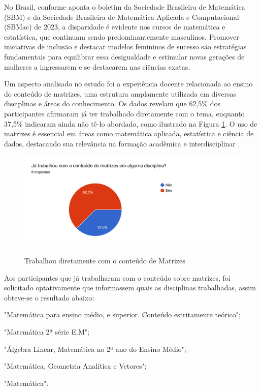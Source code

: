 No Brasil, conforme aponta o boletim da Sociedade Brasileira de Matemática (SBM) e da Sociedade Brasileira de Matemática Aplicada e Computacional (SBMac) de 2023, a disparidade é evidente nos cursos de matemática e estatística, que continuam sendo predominantemente masculinos. Promover iniciativas de inclusão e destacar modelos femininos de sucesso são estratégias fundamentais para equilibrar essa desigualdade e estimular novas gerações de mulheres a ingressarem e se destacarem nas ciências exatas.



Um aspecto analisado no estudo foi a experiência docente relacionada ao ensino do conteúdo de matrizes, uma estrutura amplamente utilizada em diversas disciplinas e áreas do conhecimento. Os dados revelam que 62,5\% dos participantes afirmaram já ter trabalhado diretamente com o tema, enquanto 37,5\% indicaram ainda não tê-lo abordado, como ilustrado na Figura \ref{fig:trabalhou_matrizes}. O uso de matrizes é essencial em áreas como matemática aplicada, estatística e ciência de dados, destacando sua relevância na formação acadêmica e interdisciplinar \cite{golub2013matrix}.

\begin{figure}[h!]
    \caption{Trabalhou diretamente com o conteúdo de Matrizes}
    \centering
    \includegraphics[scale=0.2]{figuras/resultados/trabalhou_matrizes.png}
    \label{fig:trabalhou_matrizes}
\end{figure}

Aos participantes que já trabalharam com o conteúdo sobre matrizes, foi solicitado optativamente que informassem quais as disciplinas trabalhadas, assim obteve-se o resultado abaixo:

\begin{citacao}
    \item "Matemática para ensino médio, e superior. Conteúdo estritamente teórico";
    \item "Matemática 2ª série E.M";
    \item "Álgebra Linear, Matemática no 2º ano do Ensino Médio";
    \item "Matemática, Geometria Analítica e Vetores";
    \item "Matemática".
\end{citacao}
    

